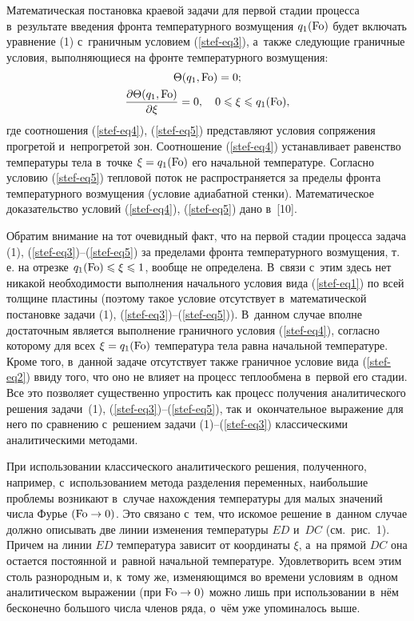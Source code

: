 Математическая постановка краевой задачи для первой стадии процесса в~результате введения фронта температурного возмущения $q_1 ({\rm Fo})$ будет включать уравнение (1) с~граничным условием (\ref{stef-eq3}), а~также следующие граничные условия, выполняющиеся на фронте температурного 
возмущения:  
\begin{gather} 
\label{stef-eq4} 
 \Theta ( q_1,  {\rm Fo})=0;
\\
\label{stef-eq5}
\frac{\partial  \Theta ( q_1,  {\rm Fo})}{\partial \xi }=0,\quad 
0\leqslant \xi \leqslant q_1 ({\rm Fo}),
\end{gather}
где соотношения (\ref{stef-eq4}), (\ref{stef-eq5}) представляют условия сопряжения прогретой 
и~непрогретой зон. Соотношение (\ref{stef-eq4}) устанавливает равенство температуры тела 
в~точке $\xi =q_1 ({\rm Fo})$ его начальной температуре. Согласно 
условию (\ref{stef-eq5}) тепловой поток не распространяется за пределы фронта 
температурного возмущения (условие адиабатной стенки). Математическое 
доказательство условий (\ref{stef-eq4}), (\ref{stef-eq5}) дано в~[10].


Обратим внимание на тот очевидный факт, что на первой стадии процесса задача 
(1), (\ref{stef-eq3})--(\ref{stef-eq5}) за пределами фронта температурного возмущения, т.\,е. на 
отрезке $q_1 ({\rm Fo})\leqslant \xi \leqslant 1$, 
вообще не определена. В~связи с~этим здесь нет никакой необходимости 
выполнения начального условия вида (\ref{stef-eq1}) по всей толщине пластины (поэтому 
такое условие отсутствует в~математической постановке задачи (1), (\ref{stef-eq3})--(\ref{stef-eq5})). В~данном случае вполне достаточным является выполнение граничного 
условия (\ref{stef-eq4}), согласно которому для всех $\xi =q_1 ( {\rm Fo})$ 
температура тела равна начальной температуре. Кроме того, в~данной задаче 
отсутствует также граничное условие вида (\ref{stef-eq2}) ввиду того, что оно не влияет 
на процесс теплообмена в~первой его стадии. Все это позволяет существенно 
упростить как процесс получения аналитического решения задачи~(1), (\ref{stef-eq3})--(\ref{stef-eq5}), так и~окончательное выражение для него по сравнению с~решением задачи 
(1)--(\ref{stef-eq3}) классическими аналитическими методами.

При использовании классического аналитического решения, полученного, 
например, с~использованием метода разделения переменных, наибольшие проблемы 
возникают в~случае нахождения температуры для малых значений числа Фурье 
$( {\rm Fo}\to 0)$. Это связано с~тем, что искомое решение в~данном случае 
должно описывать две линии изменения температуры $ED$ и~$DC$ (см.~рис.~1). 
Причем на линии $ED$ температура зависит от координаты $\xi$, а~на 
прямой $DC$ она остается постоянной и~равной начальной температуре. 
Удовлетворить всем этим столь разнородным и, к~тому же, изменяющимся во 
времени условиям в~одном аналитическом выражении (при ${\rm Fo}\to 0)$ 
можно лишь при использовании в~нём бесконечно большого числа членов ряда, о~чём уже упоминалось выше.


